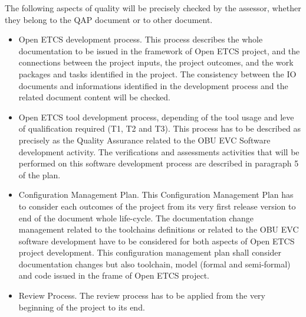 \documentclass{template/openetcs_article}
\begin{document}
The following aspects of quality will be precisely checked by the assessor, whether they belong to the QAP document or to other document.
\begin{itemize}
\item  Open ETCS development process. This process describes the whole documentation to be issued in the framework of Open ETCS project, and the connections between the project inputs, the project outcomes, and the work packages and tasks identified in the project. The consistency between the IO documents and informations identified in the development process and the related document content will be checked.
\item  Open ETCS tool development process, depending of the tool usage and leve of qualification required (T1, T2 and T3). This process has to be described as precisely as the Quality Assurance related to the OBU EVC Software development activity. The verifications and assessments activities that will be performed on this software development process are described in paragraph 5 of the plan.
\item Configuration Management Plan. This Configuration Management Plan has to consider each outcomes of the project from its very first release version to end of the document whole life-cycle. The documentation change management related to the toolchains definitions or related to the OBU EVC software development have to be considered for both aspects of Open ETCS project development. This configuration management plan shall consider documentation changes but also toolchain, model (formal and semi-formal) and code issued in the frame of Open ETCS project.
\item Review Process. The review process has to be applied from the very beginning of the project to its end.
\end{itemize}
\end{document}
